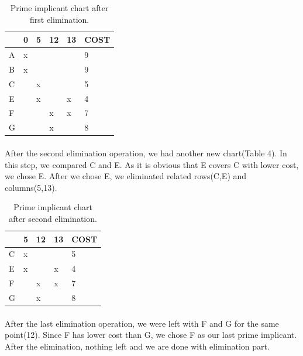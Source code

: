 \documentclass[pdftex,12pt,a4paper]{article}
\begin{document}
\begin{table}[h]
\centering
\begin{tabular}{l|l|l|l|l|l|}
\cline{2-6}
                        & 0 & 5 &  12 & 13 & COST \\ \hline
\multicolumn{1}{|l|}{A} & x &   &     &    & 9    \\ \hline
\multicolumn{1}{|l|}{B} & x &   &     &    & 9    \\ \hline
\multicolumn{1}{|l|}{C} &   & x &     &    & 5    \\ \hline
\multicolumn{1}{|l|}{E} &   & x &     & x  & 4    \\ \hline
\multicolumn{1}{|l|}{F} &   &   &  x  & x  & 7   \\ \hline
\multicolumn{1}{|l|}{G} &   &   &  x  &    & 8   \\ \hline
\end{tabular}
\caption{Prime implicant chart after first elimination.}
\label{primeimplicantchart2}
\end{table}

\clearpage

\paragraph{}
After the second elimination operation, we had another new chart(Table 4). In this step, we compared C and E. As it is obvious that E covers C with lower cost, we chose E. After we chose E, we eliminated related rows(C,E) and columns(5,13).
\newline
\newline



\begin{table}[h]
\centering
\begin{tabular}{l|l|l|l|l|}
\cline{2-5}
                        & 5 &  12 & 13 & COST \\ \hline
\multicolumn{1}{|l|}{C} & x &     &    & 5    \\ \hline
\multicolumn{1}{|l|}{E} & x &     & x  & 4    \\ \hline
\multicolumn{1}{|l|}{F} &   &  x  & x  & 7   \\ \hline
\multicolumn{1}{|l|}{G} &   &  x  &    & 8   \\ \hline
\end{tabular}
\caption{Prime implicant chart after second elimination.}
\label{primeimplicantchart3}
\end{table}

\paragraph{}
After the last elimination operation, we were left with F and G for the same point(12). Since F has lower cost than G, we chose F as our last prime implicant. After the elimination, nothing left and we are done with elimination part.
\newline
\newline
\end{document}
